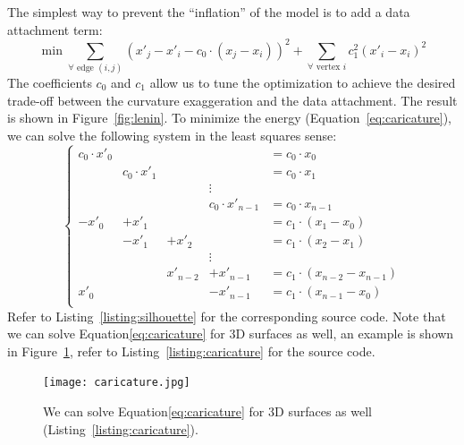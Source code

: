 \documentclass[notitlepage,oneside]{book}
\begin{document}
The simplest way to prevent the ``inflation'' of the model is to add a data attachment term:
\begin{equation}
\label{eq:caricature}
\min \sum\limits_{\forall \text{~edge~} (i,j)} \left(x'_j - x'_i -  c_0\cdot\left(x_j - x_i\right)  \right)^2 + \sum\limits_{\forall \text{~vertex~} i} c_1^2 \left( x'_i - x_i \right)^2
\end{equation}
The coefficients $c_0$ and $c_1$ allow us to tune the optimization to achieve the desired trade-off between the curvature exaggeration and the data attachment.
The result is shown in Figure~\ref{fig:lenin}.
To minimize the energy (Equation~\eqref{eq:caricature}), we can solve the following system in the least squares sense:
\begin{equation}
\label{eq:carsyst}
\left \{ \begin{array}{ccccl}
c_0\cdot x'_0 &            &       &               & =  c_0\cdot x_0  \\
& c_0\cdot x'_1            &       &               & =  c_0\cdot x_1  \\
    &       &       & \vdots    &             \\
&             &       &    c_0\cdot x'_{n-1}           & =  c_0\cdot x_{n-1}  \\
-x'_0 & + x'_1      &       &               & =  c_1\cdot \left( x_1 - x_0\right)  \\
     & - x'_1      & +x'_2      &           & =  c_1 \cdot \left(x_2 - x_1\right)  \\
    &       &       & \vdots    &             \\
    &            & x'_{n-2}   &    +x'_{n-1}       & =  c_1 \cdot \left(x_{n-2} - x_{n-1}\right)  \\
x'_0 &            &    &    -x'_{n-1}       & =  c_1 \cdot \left(x_{n-1} - x_0\right)  \\
\end{array} \right.
\end{equation}
Refer to Listing~\ref{listing:silhouette} for the corresponding source code. Note that we can solve Equation\eqref{eq:caricature} for 3D surfaces as well, an example is shown in Figure~\ref{fig:caricature},
refer to Listing~\ref{listing:caricature} for the source code.

\begin{figure}[ht]
    \centering
    \texttt{[image: caricature.jpg]}
    \caption{We can solve Equation\eqref{eq:caricature} for 3D surfaces as well (Listing~\ref{listing:caricature}).}
    \label{fig:caricature}
\end{figure}
\end{document}
